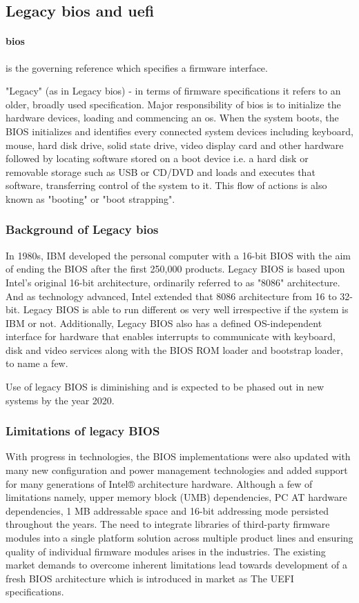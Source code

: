 \subsection{Legacy \gls{bios} and \gls{uefi}}

\paragraph{\gls{bios}} is the governing reference which specifies a firmware interface.

"Legacy" (as in Legacy \gls{bios}) -  in terms of firmware specifications it refers to an older, broadly used specification. Major responsibility of \gls{bios} is to initialize the hardware devices, loading and commencing an \gls{os}. When the system boots, the BIOS initializes and identifies every connected system devices including keyboard, mouse, hard disk drive, solid state drive, video display card and other hardware followed by locating software stored on a boot device i.e. a hard disk or removable storage such as USB or CD/DVD and loads and executes that software, transferring control of the system to it. This flow of actions is also known as "booting" or "boot strapping".

\subsubsection{Background of Legacy \gls{bios}}
In 1980s, IBM developed the personal computer with a 16-bit BIOS with the aim of ending the BIOS after the first 250,000 products. Legacy BIOS is based upon Intel’s original 16-bit architecture, ordinarily referred to as "8086" architecture. And as technology advanced, Intel extended that 8086 architecture from 16 to 32-bit. Legacy BIOS is able to run different \gls{os} very well irrespective if the system is IBM or not. Additionally, Legacy BIOS also has a defined OS-independent interface for hardware that enables interrupts to communicate with keyboard, disk and video services along with the BIOS ROM loader and bootstrap loader, to name a few.

Use of legacy BIOS is diminishing and is expected to be phased out in new systems by the year 2020.

\subsubsection{Limitations of legacy BIOS}
With progress in technologies, the BIOS implementations were also updated with many new configuration and power management technologies and added support for many generations of Intel® architecture hardware. Although a few of limitations namely, upper memory block (UMB) dependencies, PC AT hardware dependencies, 1 MB addressable space and 16-bit addressing mode persisted throughout the years. The need to integrate libraries of third-party firmware modules into a single platform solution across multiple product lines and ensuring quality of individual firmware modules arises in the industries. The existing market demands to overcome inherent limitations lead towards development of a fresh BIOS architecture which is introduced in market as The UEFI specifications.

